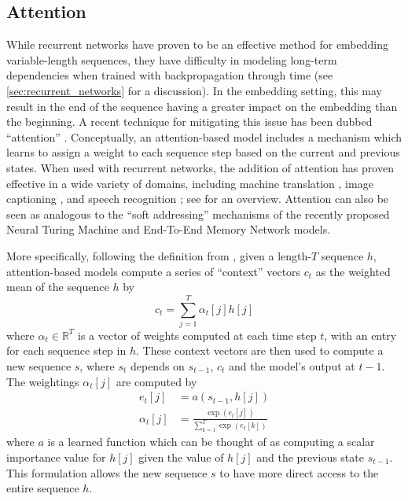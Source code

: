 \subsection{Attention}

While recurrent networks have proven to be an effective method for embedding variable-length sequences, they have difficulty in modeling long-term dependencies when trained with backpropagation through time \cite{bengio1994learning,hochreiter1997long,pascanu2013difficulty} (see \cref{sec:recurrent_networks} for a discussion).
In the embedding setting, this may result in the end of the sequence having a greater impact on the embedding than the beginning.
A recent technique for mitigating this issue has been dubbed ``attention'' \cite{bahdanau2014neural}.
Conceptually, an attention-based model includes a mechanism which learns to assign a weight to each sequence step based on the current and previous states.
When used with recurrent networks, the addition of attention has proven effective in a wide variety of domains, including machine translation \citep{bahdanau2014neural}, image captioning \citep{xu2015show}, and speech recognition \cite{chan2015listen,bahdanau2015end}; see \cite{cho2015describing} for an overview.
Attention can also be seen as analogous to the ``soft addressing'' mechanisms of the recently proposed Neural Turing Machine \cite{graves2014neural} and End-To-End Memory Network \cite{sukhbaatar2015end} models.

More specifically, following the definition from \cite{bahdanau2014neural}, given a length-$T$ sequence $h$, attention-based models compute a series of ``context'' vectors $c_t$ as the weighted mean of the sequence $h$ by
\begin{equation}
c_t = \sum_{j = 1}^T \alpha_t[j] h[j]
\end{equation}
where $\alpha_t \in \mathbb{R}^T$ is a vector of weights computed at each time step $t$, with an entry for each sequence step in $h$.
These context vectors are then used to compute a new sequence $s$, where $s_t$ depends on $s_{t - 1}$, $c_t$ and the model's output at $t - 1$.
The weightings $\alpha_t[j]$ are computed by
\begin{align}
e_t[j] &= a(s_{t - 1}, h[j])\\
\alpha_t[j] &= \frac{\exp(e_t[j])}{\sum_{k = 1}^T \exp(e_t[k])}
\end{align}
where $a$ is a learned function which can be thought of as computing a scalar importance value for $h[j]$ given the value of $h[j]$ and the previous state $s_{t - 1}$.
This formulation allows the new sequence $s$ to have more direct access to the entire sequence $h$.


